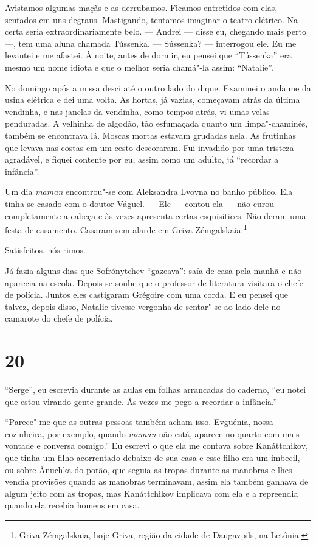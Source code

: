 Avistamos algumas maçãs e as derrubamos. Ficamos entretidos com elas,
sentados em uns degraus. Mastigando, tentamos imaginar o teatro
elétrico. Na certa seria extraordinariamente belo. --- Andrei --- disse
eu, chegando mais perto ---, tem uma aluna chamada Tússenka. ---
Sússenka? --- interrogou ele. Eu me levantei e me afastei. À noite,
antes de dormir, eu pensei que ``Tússenka'' era mesmo um nome idiota e
que o melhor seria chamá"-la assim: ``Natalie''.

No domingo após a missa desci até o outro lado do dique. Examinei o
andaime da usina elétrica e dei uma volta. As hortas, já vazias,
começavam atrás da última vendinha, e nas janelas da vendinha, como
tempos atrás, vi umas velas penduradas. A velhinha de algodão, tão
esfumaçada quanto um limpa"-chaminés, também se encontrava lá. Moscas
mortas estavam grudadas nela. As frutinhas que levava nas costas em um
cesto descoraram. Fui invadido por uma tristeza agradável, e fiquei
contente por eu, assim como um adulto, já ``recordar a infância''.

Um dia \emph{maman} encontrou"-se com Aleksandra Lvovna no banho público.
Ela tinha se casado com o doutor Váguel. --- Ele --- contou ela --- não
curou completamente a cabeça e às vezes apresenta certas esquisitices.
Não deram uma festa de casamento. Casaram sem alarde em Griva
Zémgalskaia.\footnote{Griva Zémgalskaia, hoje Griva, região da cidade de
  Daugavpils, na Letônia.}

Satisfeitos, nós rimos.

Já fazia alguns dias que Sofrónytchev ``gazeava'': saía de casa pela
manhã e não aparecia na escola. Depois se soube que o professor de
literatura visitara o chefe de polícia. Juntos eles castigaram Grégoire
com uma corda. E eu pensei que talvez, depois disso, Natalie tivesse
vergonha de sentar"-se ao lado dele no camarote do chefe de polícia.

\section{20}

``Serge'', eu escrevia durante as aulas em folhas arrancadas do caderno,
``eu notei que estou virando gente grande. Às vezes me pego a recordar a
infância.''

``Parece"-me que as outras pessoas também acham isso. Evguénia, nossa
cozinheira, por exemplo, quando \emph{maman} não está, aparece no quarto
com mais vontade e conversa comigo.'' Eu escrevi o que ela me contava
sobre Kanáttchikov, que tinha um filho acorrentado debaixo de sua casa e
esse filho era um imbecil, ou sobre Ánuchka do porão, que seguia as
tropas durante as manobras e lhes vendia provisões quando as manobras
terminavam, assim ela também ganhava de algum jeito com as tropas, mas
Kanáttchikov implicava com ela e a repreendia quando ela recebia homens
em casa.

